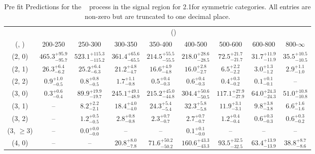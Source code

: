 \begin{table}[h!]
\tiny
\centering
\caption{Pre fit Predictions for the \zInv~ process in the signal region for 2.1\ifb for symmetric categories. All entries are non-zero but are truncated to one decimal place.\label{tab:predsepnaive_sig_zinv_sym}}
\begin{tabular}
{ccccccccc}
	\hline\hline
	& \multicolumn{8}{c}{\scalht (\gev)} \\ 
	 (\njet,  \nb) & 200-250 & 250-300 & 300-350 & 350-400 & 400-500 & 500-600 & 600-800 & 800-$\infty$ \\ [0.8ex] 
\hline
	(2, 0) & $465.3^{+ 95.9 }_{- 95.7 }$ & $523.1^{+ 115.3 }_{- 115.2 }$ & $361.4^{+ 65.6 }_{- 65.5 }$ & $214.5^{+ 55.5 }_{- 55.5 }$ & $218.0^{+ 28.6 }_{- 28.5 }$ & $72.5^{+ 21.7 }_{- 21.7 }$ & $31.7^{+ 11.9 }_{- 11.9 }$ & $35.5^{+ 10.5 }_{- 10.5 }$ \\[0.5ex] 
	(2, 1) & $26.3^{+ 6.4 }_{- 6.2 }$ & $25.2^{+ 6.4 }_{- 6.3 }$ & $21.2^{+ 4.8 }_{- 4.7 }$ & $16.6^{+ 4.9 }_{- 4.8 }$ & $16.0^{+ 2.8 }_{- 2.7 }$ & $6.5^{+ 2.2 }_{- 2.2 }$ & $3.0^{+ 1.3 }_{- 1.2 }$ & $2.9^{+ 1.1 }_{- 1.0 }$ \\[0.5ex] 
	(2, 2) & $0.9^{+ 1.0 }_{- 0.5 }$ & $0.8^{+ 0.8 }_{- 0.5 }$ & $1.7^{+ 1.1 }_{- 0.8 }$ & $0.5^{+ 0.4 }_{- 0.3 }$ & $0.6^{+ 0.4 }_{- 0.3 }$ & $0.4^{+ 0.3 }_{- 0.2 }$ & $0.1^{+ 0.1 }_{- 0.1 }$ & -- \\[0.5ex] 
	(3, 0) & $0.3^{+ 0.6 }_{- 0.4 }$ & $89.9^{+ 19.9 }_{- 19.7 }$ & $245.1^{+ 49.1 }_{- 48.9 }$ & $215.2^{+ 45.0 }_{- 44.8 }$ & $304.4^{+ 50.6 }_{- 50.5 }$ & $117.1^{+ 27.9 }_{- 27.9 }$ & $64.0^{+ 24.3 }_{- 24.3 }$ & $51.0^{+ 10.8 }_{- 10.8 }$ \\[0.5ex] 
	(3, 1) & -- & $8.2^{+ 2.2 }_{- 2.1 }$ & $18.4^{+ 4.0 }_{- 4.0 }$ & $24.3^{+ 5.4 }_{- 5.4 }$ & $32.3^{+ 5.8 }_{- 5.8 }$ & $11.9^{+ 3.1 }_{- 3.1 }$ & $9.8^{+ 3.8 }_{- 3.8 }$ & $6.6^{+ 1.6 }_{- 1.6 }$ \\[0.5ex] 
	(3, 2) & -- & $1.2^{+ 0.5 }_{- 0.5 }$ & $2.8^{+ 0.8 }_{- 0.8 }$ & $2.3^{+ 0.7 }_{- 0.7 }$ & $2.7^{+ 0.7 }_{- 0.7 }$ & $1.2^{+ 0.4 }_{- 0.4 }$ & $0.6^{+ 0.3 }_{- 0.3 }$ & $0.6^{+ 0.3 }_{- 0.2 }$ \\[0.5ex] 
	(3, $\ge3$) & -- & $0.0^{+ 0.0 }_{- 0.0 }$ & -- & -- & $0.1^{+ 0.1 }_{- 0.0 }$ & -- & -- & -- \\[0.5ex] 
	(4, 0) & -- & -- & $20.8^{+ 8.0 }_{- 7.8 }$ & $71.6^{+ 50.2 }_{- 50.2 }$ & $160.6^{+ 43.3 }_{- 43.3 }$ & $93.5^{+ 32.5 }_{- 32.5 }$ & $63.4^{+ 13.9 }_{- 13.9 }$ & $38.8^{+ 8.7 }_{- 8.6 }$ \\[0.5ex] 

\end{tabular}
\end{table}
